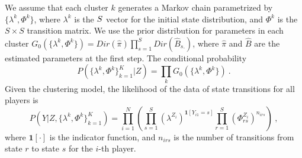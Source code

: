 We assume that each cluster $k$ generates a Markov chain parametrized by $\{\lambda^k, \Phi^k\}$, 
where $\lambda^k$ is the $S\time 1$ vector for the initial state distribution, 
and $\Phi^k$ is the $S \times S$ transition matrix. We use the prior distribution 
for parameters in each cluster $G_0(\{\lambda^k, \Phi^k\}) = Dir(\hat\pi) \prod_{s=1}^S Dir (\hat B_{s.})$,
where $\hat\pi$ and $\hat B$ are the estimated parameters at the first step. 
The conditional probability  
\begin{equation}
\label{eq:condi}
  P(\{\lambda^k, \Phi^k \}_{k=1}^K | Z ) 
= \prod_k G_0(\{\lambda^k, \Phi^k\})~.
\end{equation}
Given the clustering model, the likelihood of the data of state transitions for all players is
\begin{equation}
\label{eq:likeli}
  P(Y| Z, \{\lambda^k, \Phi^k \}_{k=1}^K) 
= \prod_{i=1}^N \left( \prod_{s=1}^S (\lambda^{Z_i})^{\mathbf{1}[Y_{i1} = s]} \prod_{r=1}^S \left(\Phi_{rs}^{Z_i}\right)^{n_{irs}} \right)~,
\end{equation}
where $\mathbf{1} [\cdot]$ is the indicator function, and $n_{irs}$ is the number of transitions from state $r$ to state $s$ for the $i$-th player.


